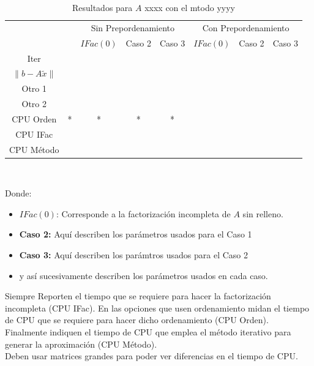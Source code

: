 \documentclass{article}
\begin{document}
\begin{enumerate}
\begin{table}[H]
\begin{tabular}{|c||c||c|c|c||c|c|c|}
\cline{3-8}

& & \multicolumn{3}{|c||}{Sin Prepordenamiento} &

\multicolumn{3}{c|}{Con Prepordenamiento} \\

\cline{3-8}

& & $IFac(0)$ & Caso 2 & Caso 3 &

$IFac(0)$ & Caso 2 & Caso 3 \\ \hline \hline

Iter & & & & & & & \\

$\|b-A\widetilde{x}\|$ & & & & & & & \\

Otro 1 & & & & & & & \\

Otro 2 & & & & & & & \\

CPU Orden & * & * & * & * & & & \\

CPU IFac & & & & & & & \\

CPU Método & & & & & & & \\ 
\hline

\end{tabular} \\

\caption{Resultados para $A$ xxxx con el mtodo yyyy}

\label{tab:T1}

\end{table}
Donde:
\begin{itemize}
\item $IFac(0)$: Corresponde a la factorización incompleta de $A$ sin relleno.
\item {\bf Caso 2:} Aquí describen los parámetros usados para el Caso 1
\item {\bf Caso 3:} Aquí describen los parámtros usados para el Caso 2
\item y así sucesivamente describen los parámetros usados en cada caso.
\end{itemize}
Siempre Reporten el tiempo que se requiere para hacer la factorización incompleta (CPU IFac). En las opciones que usen ordenamiento midan el tiempo de CPU que se requiere para hacer dicho ordenamiento (CPU Orden). Finalmente indiquen el tiempo de CPU que emplea el método iterativo para generar la aproximación (CPU Método).\\
Deben usar matrices grandes para poder ver diferencias en el tiempo de CPU.
\end{enumerate}
\end{document}

